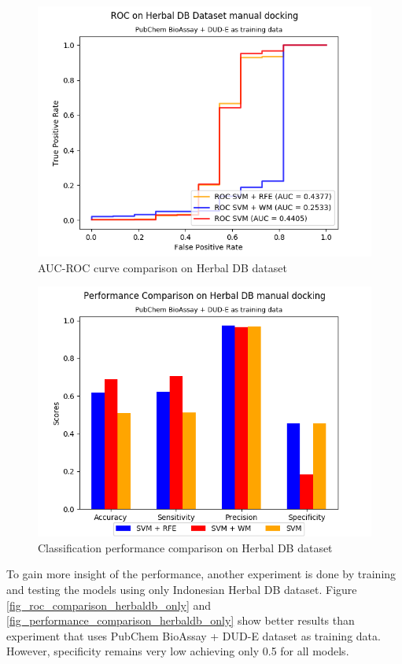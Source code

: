 \documentclass[conference,compsoc,12pt]{IEEEtran}
\begin{document}
	\begin{figure}
		\includegraphics[scale=0.5]{../images/03-evaluate-3_roc_chart.png}
		\caption{AUC-ROC curve comparison on Herbal DB dataset}
		\label{fig_roc_comparison_herbaldb}
	\end{figure}
	
	\begin{figure}
		\includegraphics[scale=0.5]{../images/03-evaluate-3_scores_chart.png}
		\caption{Classification performance comparison on Herbal DB dataset}
		\label{fig_performance_comparison_herbaldb}
	\end{figure}
	
	To gain more insight of the performance, another experiment is done by training and testing the models using only Indonesian Herbal DB dataset. Figure \ref{fig_roc_comparison_herbaldb_only} and \ref{fig_performance_comparison_herbaldb_only} show better results than experiment that uses PubChem BioAssay + DUD-E dataset as training data. However, specificity remains very low achieving only 0.5 for all models.
	
\end{document}
